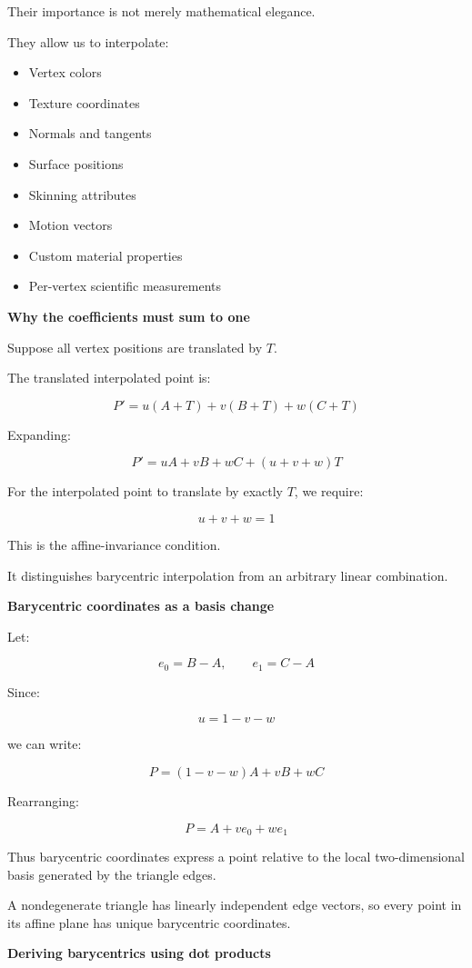 Their importance is not merely mathematical elegance.

They allow us to interpolate:

\begin{itemize}
\tightlist
\item
  Vertex colors
\item
  Texture coordinates
\item
  Normals and tangents
\item
  Surface positions
\item
  Skinning attributes
\item
  Motion vectors
\item
  Custom material properties
\item
  Per-vertex scientific measurements
\end{itemize}

\textbf{Why the coefficients must sum to one}

Suppose all vertex positions are translated by \(T\).

The translated interpolated point is:

\[
P'=u(A+T)+v(B+T)+w(C+T)
\]

Expanding:

\[
P'=uA+vB+wC+(u+v+w)T
\]

For the interpolated point to translate by exactly \(T\), we require:

\[
u+v+w=1
\]

This is the affine-invariance condition.

It distinguishes barycentric interpolation from an arbitrary linear combination.

\textbf{Barycentric coordinates as a basis change}

Let:

\[
e_0=B-A,\qquad e_1=C-A
\]

Since:

\[
u=1-v-w
\]

we can write:

\[
P=(1-v-w)A+vB+wC
\]

Rearranging:

\[
\boxed{P=A+ve_0+we_1}
\]

Thus barycentric coordinates express a point relative to the local two-dimensional basis generated by the triangle edges.

A nondegenerate triangle has linearly independent edge vectors, so every point in its affine plane has unique barycentric coordinates.

\textbf{Deriving barycentrics using dot products}

